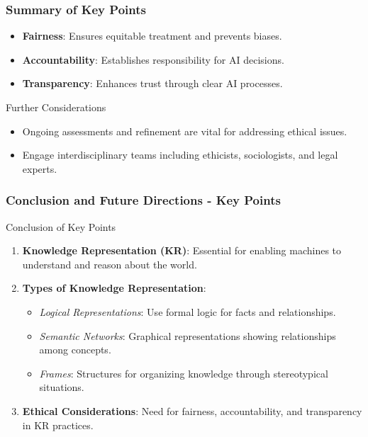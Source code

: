 \documentclass[aspectratio=169]{beamer}
\begin{document}
\begin{frame}[fragile]
    \frametitle{Summary of Key Points}
    \begin{itemize}
        \item \textbf{Fairness}: Ensures equitable treatment and prevents biases.
        \item \textbf{Accountability}: Establishes responsibility for AI decisions.
        \item \textbf{Transparency}: Enhances trust through clear AI processes.
    \end{itemize}

    \begin{block}{Further Considerations}
        \begin{itemize}
            \item Ongoing assessments and refinement are vital for addressing ethical issues.
            \item Engage interdisciplinary teams including ethicists, sociologists, and legal experts.
        \end{itemize}
    \end{block}
\end{frame}

\begin{frame}[fragile]
  \frametitle{Conclusion and Future Directions - Key Points}
  
  \begin{block}{Conclusion of Key Points}
    \begin{enumerate}
      \item \textbf{Knowledge Representation (KR)}: Essential for enabling machines to understand and reason about the world.
      \item \textbf{Types of Knowledge Representation}:
        \begin{itemize}
          \item \textit{Logical Representations}: Use formal logic for facts and relationships.
          \item \textit{Semantic Networks}: Graphical representations showing relationships among concepts.
          \item \textit{Frames}: Structures for organizing knowledge through stereotypical situations.
        \end{itemize}
      \item \textbf{Ethical Considerations}: Need for fairness, accountability, and transparency in KR practices.
    \end{enumerate}
  \end{block}
\end{frame}
\end{document}
